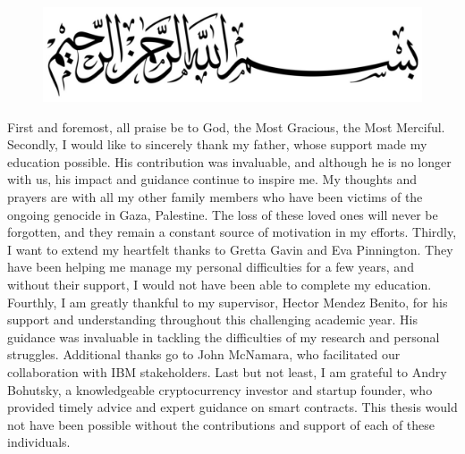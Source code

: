 \begin{figure}[h!]
    \centering
    \includegraphics[width=0.92\linewidth]{LATEX/Appendices/Images/Acknowledgment/bismilLah.jpg}
    \label{fig:beesmiLah}
\end{figure}
\vspace{-10pt}

\hspace{-6.53mm}  First and foremost, all praise be to God, the Most Gracious, the Most Merciful. Secondly, I would like to sincerely thank my father, whose support made my education possible. His contribution was invaluable, and although he is no longer with us, his impact and guidance continue to inspire me. My thoughts and prayers are with all my other family members who have been victims of the ongoing genocide in Gaza, Palestine. The loss of these loved ones will never be forgotten, and they remain a constant source of motivation in my efforts. Thirdly, I want to extend my heartfelt thanks to Gretta Gavin and Eva Pinnington. They have been helping me manage my personal difficulties for a few years, and without their support, I would not have been able to complete my education. Fourthly, I am greatly thankful to my supervisor, Hector Mendez Benito, for his support and understanding throughout this challenging academic year. His guidance was invaluable in tackling the difficulties of my research and personal struggles. Additional thanks go to John McNamara, who facilitated our collaboration with IBM stakeholders. Last but not least, I am grateful to Andry Bohutsky, a knowledgeable cryptocurrency investor and startup founder, who provided timely advice and expert guidance on smart contracts. This thesis would not have been possible without the contributions and support of each of these individuals.